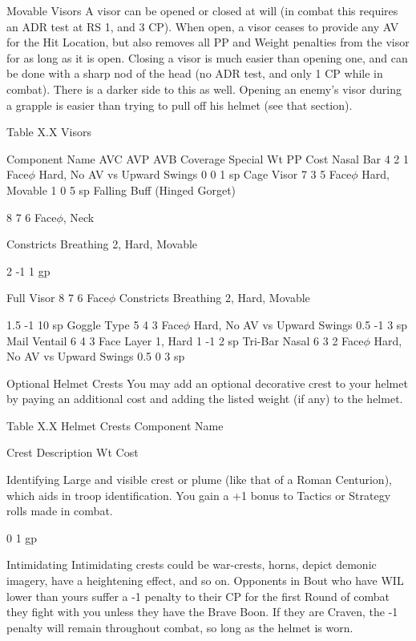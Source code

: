 \documentclass[oneside,11pt,english]{book}
\begin{document}
 

Movable Visors 
A visor can be opened or closed at will (in combat this requires an ADR test at RS 1, and 3 CP). When 
open, a visor ceases to provide any AV for the Hit Location, but also removes all PP and Weight penalties 
from the visor for as long as it is open. Closing a visor is much easier than opening one, and can be done 
with a sharp nod of the head (no ADR test, and only 1 CP while in combat). There is a darker side to this 
as well. Opening an enemy’s visor during a grapple is easier than trying to pull off his helmet (see that 
section). 

 

Table X.X Visors 


Component Name AVC AVP AVB Coverage Special Wt PP Cost 
Nasal Bar 4 2 1 Face$\phi$ Hard, No AV vs Upward Swings 0 0 1 sp 
Cage Visor 7 3 5 Face$\phi$ Hard, Movable 1 0 5 sp 
Falling Buff (Hinged 
Gorget) 

8 7 6 Face$\phi$, 
Neck 

Constricts Breathing 2, Hard, 
Movable 

2 -1 1 gp 

Full Visor 8 7 6 Face$\phi$ Constricts Breathing 2, Hard, 
Movable 

1.5 -1 10 
sp 
Goggle Type 5 4 3 Face$\phi$ Hard, No AV vs Upward Swings 0.5 -1 3 sp 
Mail Ventail 6 4 3 Face Layer 1, Hard 1 -1 2 sp 
Tri-Bar Nasal 6 3 2 Face$\phi$ Hard, No AV vs Upward Swings 0.5 0 3 sp 

 

 

Optional Helmet Crests 
You may add an optional decorative crest to your helmet by paying an additional cost and adding the 
listed weight (if any) to the helmet. 

 

Table X.X Helmet Crests 
Component 
Name 

Crest Description Wt Cost 

Identifying Large and visible crest or plume (like that of a Roman Centurion), which aids in troop 
identification. You gain a +1 bonus to Tactics or Strategy rolls made in combat. 

0 1 gp 

Intimidating Intimidating crests could be war-crests, horns, depict demonic imagery, have a heightening 
effect, and so on. Opponents in Bout who have WIL lower than yours suffer a -1 penalty to their 
CP for the first Round of combat they fight with you unless they have the Brave Boon. If they 
are Craven, the -1 penalty will remain throughout combat, so long as the helmet is worn. 
\end{document}
